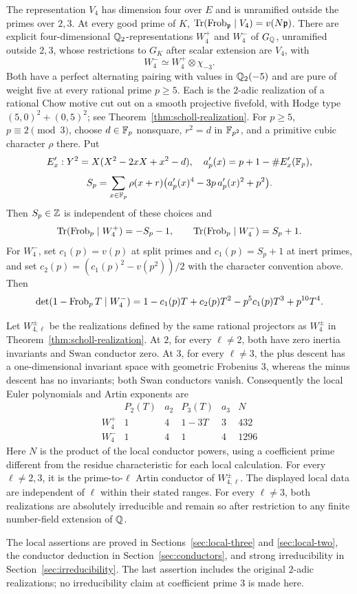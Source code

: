 \begin{theorem}\label{thm:main}
The representation $V_4$ has dimension four over $E$ and is unramified
outside the primes over $2,3$. At every good prime of $K$,
$\operatorname{Tr}(\operatorname{Frob}_{\mathfrak p}\mid V_4)=v(N\mathfrak p)$.
There are explicit four-dimensional $\mathbb Q_2$-representations $W_4^+$ and
$W_4^-$ of $G_\mathbb Q$, unramified outside $2,3$, whose restrictions to $G_K$
after scalar extension are $V_4$, with
\[
 W_4^-\simeq W_4^+\otimes\chi_{-3}.
\]
Both have a perfect alternating pairing with values in $\mathbb Q_2(-5)$
and are pure of weight five at every rational prime $p\ge5$.
Each is the $2$-adic realization of a rational Chow motive cut out on a
smooth projective fivefold, with Hodge type $(5,0)^2+(0,5)^2$;
see Theorem~\ref{thm:scholl-realization}.
For $p\ge5$, $p\equiv2\pmod3$, choose $d\in\mathbb F_p$ nonsquare,
$r^2=d$ in $\mathbb F_{p^2}$, and a primitive cubic character $\rho$ there.
Put
\[
 E'_x:Y^2=X(X^2-2xX+x^2-d),\quad a'_p(x)=p+1-\#E'_x(\mathbb F_p),
\]
\[
 S_p=\sum_{x\in\mathbb F_p}\rho(x+r)
       \bigl(a'_p(x)^4-3p\,a'_p(x)^2+p^2\bigr).
\]
Then $S_p\in\mathbb Z$ is independent of these choices and
\[
 \operatorname{Tr}(\operatorname{Frob}_p\mid W_4^+)=-S_p-1,\qquad
 \operatorname{Tr}(\operatorname{Frob}_p\mid W_4^-)=S_p+1.
\]
For $W_4^-$, set $c_1(p)=v(p)$ at split primes and $c_1(p)=S_p+1$
at inert primes, and set $c_2(p)=(c_1(p)^2-v(p^2))/2$ with the
character convention above. Then
\[
 \det(1-\operatorname{Frob}_pT\mid W_4^-)
 =1-c_1(p)T+c_2(p)T^2-p^5c_1(p)T^3+p^{10}T^4.
\]
\end{theorem}
\begin{theorem}\label{thm:main-local}
Let $W_{4,\ell}^{\pm}$ be the realizations defined by the same rational
projectors as $W_4^{\pm}$ in Theorem~\ref{thm:scholl-realization}.
At $2$, for every $\ell\ne2$, both have zero inertia invariants and
Swan conductor zero. At $3$, for every $\ell\ne3$, the plus descent
has a one-dimensional invariant space with geometric Frobenius $3$,
whereas the minus descent has no invariants; both Swan conductors vanish.
Consequently the local Euler polynomials and Artin exponents are
\[
\begin{array}{c|cc|cc|c}
 &P_2(T)&a_2&P_3(T)&a_3&N\\\hline
W_4^+&1&4&1-3T&3&432\\
W_4^-&1&4&1&4&1296
\end{array}
\]
Here $N$ is the product of the local conductor powers, using a coefficient
prime different from the residue characteristic for each local calculation.
For every $\ell\ne2,3$, it is the prime-to-$\ell$ Artin conductor of
$W_{4,\ell}^{\pm}$. The displayed local data are independent of $\ell$
within their stated ranges.
For every $\ell\ne3$, both realizations are absolutely irreducible and
remain so after restriction to any finite number-field extension of $\mathbb Q$.
\end{theorem}
The local assertions are proved in Sections~\ref{sec:local-three} and
\ref{sec:local-two}, the conductor deduction in Section~\ref{sec:conductors},
and strong irreducibility in Section~\ref{sec:irreducibility}.
The last assertion includes the original $2$-adic realizations; no
irreducibility claim at coefficient prime $3$ is made here.

